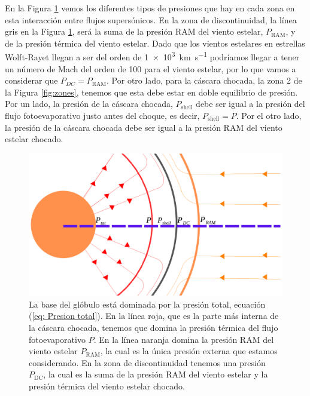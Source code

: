 \documentclass{book}
\begin{document}
En la Figura \ref{fig:zones_presiones} vemos los diferentes tipos de presiones que hay en cada zona en esta interacción entre flujos supersónicos. En la zona de discontinuidad, la línea gris en la Figura \ref{fig:zones_presiones}, será la suma de la presión RAM del viento estelar, $P_\mathrm{RAM}$, y de la presión térmica del viento estelar. Dado que los vientos estelares en estrellas Wolft-Rayet llegan a ser del orden de \SI{1e3}{km.s^{-1}} podríamos llegar a tener un número de Mach del orden de 100 para el viento estelar, por lo que vamos a considerar que $P_{DC}=P_\mathrm{RAM}$. Por otro lado, para la cáscara chocada, la zona 2 de la Figura \ref{fig:zones}, tenemos que esta debe estar en doble equilibrio de presión. Por un lado, la presión de la cáscara chocada, $P_\mathrm{shell}$ debe ser igual a la presión del flujo fotoevaporativo justo antes del choque, es decir, $P_\mathrm{shell}=P$. Por el otro lado, la presión de la cáscara chocada debe ser igual a la presión RAM del viento estelar chocado.

\begin{figure}[htb]
    \centering    \includegraphics[width=\textwidth]{imagenes_corregidas/Arreglo 03.pdf}
    \caption{La base del glóbulo está dominada por la presión total, ecuación (\ref{eq: Presion total}). En la línea roja, que es la parte más interna de la cáscara chocada, tenemos que domina la presión térmica del flujo fotoevaporativo $P$. En la línea naranja domina la presión RAM del viento estelar $P_\mathrm{RAM}$, la cual es la única presión externa que estamos considerando. En la zona de discontinuidad tenemos una presión $P_\mathrm{DC}$, la cual es la suma de la presión RAM del viento estelar y la presión térmica del viento estelar chocado. }
    \label{fig:zones_presiones}
\end{figure}
\end{document}
